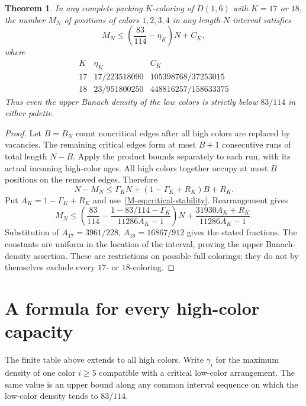 \documentclass[11pt,reqno]{amsart}
\theoremstyle{plain}
\newtheorem{theorem}{Theorem}
\newcommand{\D}[1]{D(1,#1)}
\theoremstyle{plain}
\theoremstyle{plain}
\begin{document}
\begin{theorem}\label{M-thm:low-high-tradeoff}
In any complete packing $K$-coloring of $\D{6}$ with $K=17$ or $18$,
the number $M_N$ of positions of colors $1,2,3,4$ in any length-$N$
interval satisfies
\[
 M_N\le\left(\frac{83}{114}-\eta_K\right)N+C_K,
\]
where
\[
\begin{array}{c|cc}
K&\eta_K&C_K\\\hline
17&17/223518090&105398768/37253015\\
18&23/951800250&448816257/158633375
\end{array}
\]
Thus even the upper Banach density of the low colors is strictly below
$83/114$ in either palette.
\end{theorem}
\begin{proof}
Let $B=B_N$ count noncritical edges after all high colors are replaced
by vacancies. The remaining critical edges form at most $B+1$ consecutive
runs of total length $N-B$. Apply the product bounds separately to each
run, with its actual incoming high-color ages. All high colors together
occupy at most $B$ positions on the removed edges. Therefore
\[
 N-M_N\le\Gamma_K N+(1-\Gamma_K+R_K)B+R_K.
\]
Put $A_K=1-\Gamma_K+R_K$ and use~\eqref{M-eq:critical-stability}.
Rearrangement gives
\[
 M_N\le
 \left(\frac{83}{114}-
 \frac{1-83/114-\Gamma_K}{11286A_K-1}\right)N
 +\frac{31930A_K+R_K}{11286A_K-1}.
\]
Substitution of
$A_{17}=3961/228$, $A_{18}=16867/912$ gives the stated fractions.
The constants are uniform in the location of the interval, proving the
upper Banach-density assertion. These are restrictions on possible full
colorings; they do not by themselves exclude every $17$- or $18$-coloring.
\end{proof}



\section{A formula for every high-color capacity}\label{M-sec:all-high}

The finite table above extends to all high colors. Write $\gamma_i$ for
the maximum density of one color $i\ge5$ compatible with a critical
low-color arrangement. The same value is an upper bound along any common
interval sequence on which the low-color density tends to $83/114$.
\end{document}
